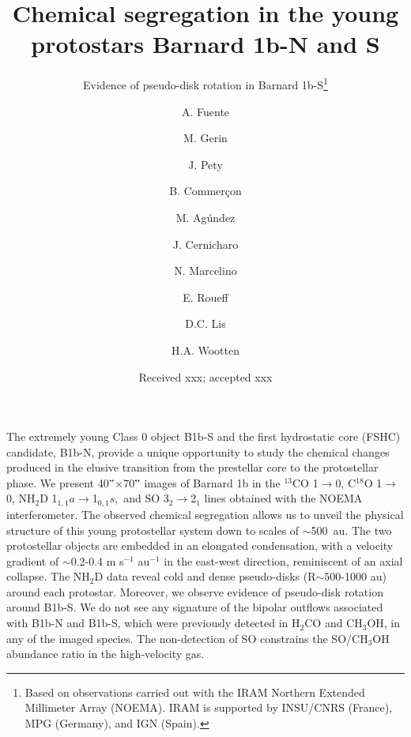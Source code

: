 \documentclass[letter]{aa}
\begin{document}
 


   \title{Chemical segregation in the young protostars Barnard 1b-N and S}

   \subtitle{Evidence of pseudo-disk rotation in Barnard 1b-S\thanks{Based on observations carried out with the IRAM  Northern Extended Millimeter Array (NOEMA). IRAM is supported by INSU/CNRS (France), MPG (Germany), and IGN (Spain).}}

   \author{ A. Fuente 
\and M. Gerin  
\and J. Pety 
\and B. Commer\c con 
\and M. Ag\'undez 
\and J. Cernicharo 
\and N. Marcelino 
\and E. Roueff 
\and D.C. Lis 
\and H.A. Wootten 
 }


   \date{Received xxx; accepted xxx}

 
  \abstract
{The extremely young Class 0 object B1b-S and the first hydrostatic
core (FSHC) candidate, B1b-N, provide a unique opportunity to study the chemical changes produced
in the elusive transition from the prestellar core to the protostellar phase. We present 40$"$$\times$70$"$ images of 
Barnard 1b in the $^{13}$CO 1$\rightarrow$0, 
   C$^{18}$O 1$\rightarrow$0, NH$_2$D  1$_{1,1}a$$\rightarrow$1$_{0,1}s,$ and SO 3$_2$$\rightarrow$2$_1$ lines
   obtained with the NOEMA interferometer. The observed chemical segregation allows us to
   unveil the physical structure of this young protostellar system down 
   to scales of $\sim$500~au.    
The two protostellar objects are embedded in an elongated 
condensation, with a velocity gradient of $\sim$0.2-0.4 m s$^{-1}$ au$^{-1}$ in the east-west direction, reminiscent of
an axial collapse. The NH$_2$D data reveal cold 
and dense pseudo-disks (R$\sim$500-1000 au) around each protostar. Moreover, 
we observe evidence of pseudo-disk rotation around B1b-S.
We do not see any signature of the bipolar outflows associated with B1b-N and B1b-S, which were previously 
detected in H$_2$CO and CH$_3$OH, in any of the imaged species.
The non-detection of SO constrains the SO/CH$_3$OH abundance ratio in the high-velocity gas.
}
\end{document}
